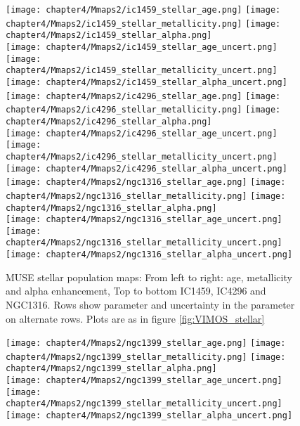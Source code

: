 \begin{figure*}
	\centering
	\texttt{[image: chapter4/Mmaps2/ic1459\_stellar\_age.png]}
	\texttt{[image: chapter4/Mmaps2/ic1459\_stellar\_metallicity.png]}
	\texttt{[image: chapter4/Mmaps2/ic1459\_stellar\_alpha.png]}
	\\
	\texttt{[image: chapter4/Mmaps2/ic1459\_stellar\_age\_uncert.png]}
	\texttt{[image: chapter4/Mmaps2/ic1459\_stellar\_metallicity\_uncert.png]}
	\texttt{[image: chapter4/Mmaps2/ic1459\_stellar\_alpha\_uncert.png]}
	\\
	\texttt{[image: chapter4/Mmaps2/ic4296\_stellar\_age.png]}
	\texttt{[image: chapter4/Mmaps2/ic4296\_stellar\_metallicity.png]}
	\texttt{[image: chapter4/Mmaps2/ic4296\_stellar\_alpha.png]}
	\\
	\texttt{[image: chapter4/Mmaps2/ic4296\_stellar\_age\_uncert.png]}
	\texttt{[image: chapter4/Mmaps2/ic4296\_stellar\_metallicity\_uncert.png]}
	\texttt{[image: chapter4/Mmaps2/ic4296\_stellar\_alpha\_uncert.png]}
	\\
	\texttt{[image: chapter4/Mmaps2/ngc1316\_stellar\_age.png]}
	\texttt{[image: chapter4/Mmaps2/ngc1316\_stellar\_metallicity.png]}
	\texttt{[image: chapter4/Mmaps2/ngc1316\_stellar\_alpha.png]}
	\\
	\texttt{[image: chapter4/Mmaps2/ngc1316\_stellar\_age\_uncert.png]}
	\texttt{[image: chapter4/Mmaps2/ngc1316\_stellar\_metallicity\_uncert.png]}
	\texttt{[image: chapter4/Mmaps2/ngc1316\_stellar\_alpha\_uncert.png]}
	\\
	\caption[MUSE stellar population maps]{MUSE stellar population maps: From left to right: age, metallicity and alpha enhancement, Top to bottom IC1459, IC4296 and NGC1316. Rows show parameter and uncertainty in the parameter on alternate rows. Plots are as in figure \ref{fig:VIMOS_stellar}}
\end{figure*}

\begin{figure*}
	\centering
	\texttt{[image: chapter4/Mmaps2/ngc1399\_stellar\_age.png]}
	\texttt{[image: chapter4/Mmaps2/ngc1399\_stellar\_metallicity.png]}
	\texttt{[image: chapter4/Mmaps2/ngc1399\_stellar\_alpha.png]}
	\\
	\texttt{[image: chapter4/Mmaps2/ngc1399\_stellar\_age\_uncert.png]}
	\texttt{[image: chapter4/Mmaps2/ngc1399\_stellar\_metallicity\_uncert.png]}
	\texttt{[image: chapter4/Mmaps2/ngc1399\_stellar\_alpha\_uncert.png]}
	\\
\end{figure*}